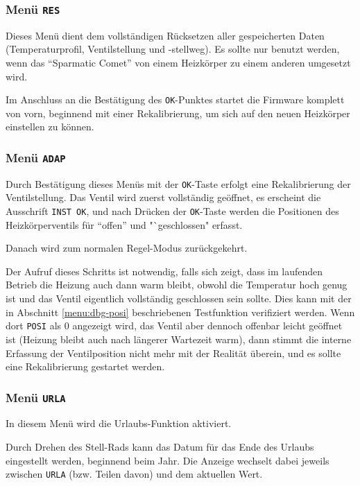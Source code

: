 \documentclass[a5paper]{article}
\newcommand\SC{"`Sparmatic Comet"'}
\begin{document}
\subsubsection {
  Menü \texttt{RES}\label{menu:res}
}

Dieses Menü dient dem vollständigen Rücksetzen aller gespeicherten
Daten (Temperaturprofil, Ventilstellung und -stellweg).  Es sollte nur
benutzt werden, wenn das \SC{} von einem Heizkörper zu einem anderen
umgesetzt wird.

Im Anschluss an die Bestätigung des \texttt{OK}-Punktes startet die
Firmware komplett von vorn, beginnend mit einer Rekalibrierung, um
sich auf den neuen Heizkörper einstellen zu können.

\subsubsection {
  Menü \texttt{ADAP}
}

Durch Bestätigung dieses Menüs mit der \texttt{OK}-Taste erfolgt
eine Rekalibrierung der Ventilstellung.  Das Ventil wird zuerst
vollständig geöffnet, es erscheint die Ausschrift \texttt{INST OK},
und nach Drücken der \texttt{OK}-Taste werden die Positionen des
Heizkörperventils für "`offen"' und "`geschlossen" erfasst.

Danach wird zum normalen Regel-Modus zurückgekehrt.

Der Aufruf dieses Schritts ist notwendig, falls sich zeigt, dass im
laufenden Betrieb die Heizung auch dann warm bleibt, obwohl die
Temperatur hoch genug ist und das Ventil eigentlich vollständig
geschlossen sein sollte.  Dies kann mit der in Abschnitt
\ref{menu:dbg-posi} beschriebenen Testfunktion verifiziert werden.
Wenn dort \texttt{POSI} als 0 angezeigt wird, das Ventil aber dennoch
offenbar leicht geöffnet ist (Heizung bleibt auch nach längerer
Wartezeit warm), dann stimmt die interne Erfassung der Ventilposition
nicht mehr mit der Realität überein, und es sollte eine Rekalibrierung
gestartet werden.

\subsubsection {
  Menü \texttt{URLA}
}

In diesem Menü wird die Urlaubs-Funktion aktiviert.

Durch Drehen des Stell-Rads kann das Datum für das Ende des Urlaubs
eingestellt werden, beginnend beim Jahr.  Die Anzeige wechselt dabei
jeweils zwischen \texttt{URLA} (bzw. Teilen davon) und dem aktuellen
Wert.
\end{document}
